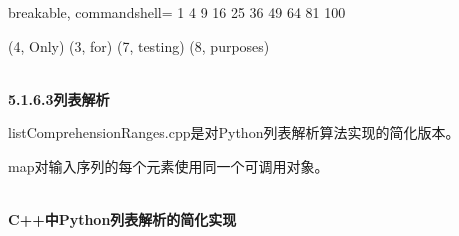 \begin{tcblisting}{breakable, commandshell={}}
1 4 9 16 25 36 49 64 81 100

(4, Only) (3, for) (7, testing) (8, purposes)
\end{tcblisting}

\hspace*{\fill} \\ %
\noindent
\textbf{5.1.6.3\hspace{0.2cm}列表解析}

listComprehensionRanges.cpp是对Python列表解析算法实现的简化版本。

map对输入序列的每个元素使用同一个可调用对象。

\hspace*{\fill} \\ %
\noindent
\textbf{C++中Python列表解析的简化实现}
